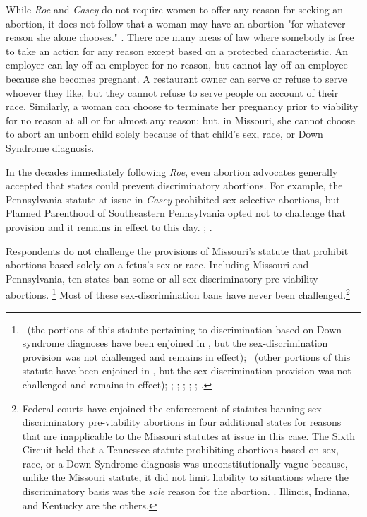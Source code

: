 \documentclass[12pt,\documentclassflag]{SCOTUS_Brief}
\begin{document}
While \textit{Roe} \cite[!]{Roe} and \textit{Casey} \cite[!]{Casey} do not require women to offer any reason for seeking an abortion, it does not follow that a woman may have an abortion "for whatever reason she alone chooses." . There are many areas of law where somebody is free to take an action for any reason except based on a protected characteristic. An employer can lay off an employee for no reason, but cannot lay off an employee because she becomes pregnant. A restaurant owner can serve or refuse to serve whoever they like, but they cannot refuse to serve people on account of their race. Similarly, a woman can choose to terminate her pregnancy prior to viability for no reason at all or for almost any reason; but, in Missouri, she cannot choose to abort an unborn child solely because of that child’s sex, race, or Down Syndrome diagnosis.

In the decades immediately following \textit{Roe}, even abortion advocates generally accepted that states could prevent discriminatory abortions. For example, the Pennsylvania statute at issue in \textit{Casey} prohibited sex-selective abortions, but Planned Parenthood of Southeastern Pennsylvania opted not to challenge that provision and it remains in effect to this day. \See  {}; \seealso {}. 

Respondents do not challenge the provisions of Missouri’s statute that prohibit abortions based solely on a fetus’s sex or race. Including Missouri and Pennsylvania, ten states ban some or all sex-discriminatory pre-viability abortions. \footnote{\See {}~(the portions of this statute pertaining to discrimination based on Down syndrome diagnoses have been enjoined in \cite{Isaacson}, but the sex-discrimination provision was not challenged and remains in effect); ~(other portions of this statute have been enjoined in \cite{Hopkins}, but the sex-discrimination provision was not challenged and remains in effect); ; ; ; ; ; . } Most of these sex-discrimination bans have never been challenged.\footnote{Federal courts have enjoined the enforcement of statutes banning sex-discriminatory pre-viability abortions in four additional states for reasons that are inapplicable to the Missouri statutes at issue in this case. The Sixth Circuit held that a Tennessee statute prohibiting abortions based on sex, race, or a Down Syndrome diagnosis was unconstitutionally vague because, unlike the Missouri statute, it did not limit liability to situations where the discriminatory basis was the \textit{sole} reason for the abortion. \Seegenerally \cite{Memphis}. Illinois, Indiana, and Kentucky are the others.}
\end{document}
